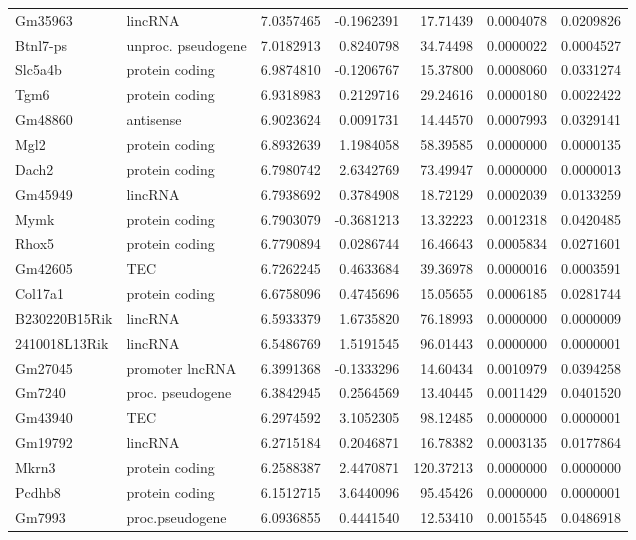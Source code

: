 \documentclass[onehalf,12pt]{beavtex}
\begin{document}
\begin{longtable}{llrrrrr}
  Gm35963 & lincRNA & 7.0357465 & -0.1962391 & 17.71439 & 0.0004078 & 0.0209826\\
  Btnl7-ps & unproc. pseudogene & 7.0182913 & 0.8240798 & 34.74498 & 0.0000022 & 0.0004527\\
  Slc5a4b & protein coding & 6.9874810 & -0.1206767 & 15.37800 & 0.0008060 & 0.0331274\\
  \addlinespace
  Tgm6 & protein coding & 6.9318983 & 0.2129716 & 29.24616 & 0.0000180 & 0.0022422\\
  Gm48860 & antisense & 6.9023624 & 0.0091731 & 14.44570 & 0.0007993 & 0.0329141\\
  Mgl2 & protein coding & 6.8932639 & 1.1984058 & 58.39585 & 0.0000000 & 0.0000135\\
  Dach2 & protein coding & 6.7980742 & 2.6342769 & 73.49947 & 0.0000000 & 0.0000013\\
  Gm45949 & lincRNA & 6.7938692 & 0.3784908 & 18.72129 & 0.0002039 & 0.0133259\\
  \addlinespace
  Mymk & protein coding & 6.7903079 & -0.3681213 & 13.32223 & 0.0012318 & 0.0420485\\
  Rhox5 & protein coding & 6.7790894 & 0.0286744 & 16.46643 & 0.0005834 & 0.0271601\\
  Gm42605 & TEC & 6.7262245 & 0.4633684 & 39.36978 & 0.0000016 & 0.0003591\\
  Col17a1 & protein coding & 6.6758096 & 0.4745696 & 15.05655 & 0.0006185 & 0.0281744\\
  B230220B15Rik & lincRNA & 6.5933379 & 1.6735820 & 76.18993 & 0.0000000 & 0.0000009\\
  \addlinespace
  2410018L13Rik & lincRNA & 6.5486769 & 1.5191545 & 96.01443 & 0.0000000 & 0.0000001\\
  Gm27045 & promoter lncRNA & 6.3991368 & -0.1333296 & 14.60434 & 0.0010979 & 0.0394258\\
  Gm7240 & proc. pseudogene & 6.3842945 & 0.2564569 & 13.40445 & 0.0011429 & 0.0401520\\
  Gm43940 & TEC & 6.2974592 & 3.1052305 & 98.12485 & 0.0000000 & 0.0000001\\
  Gm19792 & lincRNA & 6.2715184 & 0.2046871 & 16.78382 & 0.0003135 & 0.0177864\\
  \addlinespace
  Mkrn3 & protein coding & 6.2588387 & 2.4470871 & 120.37213 & 0.0000000 & 0.0000000\\
  Pcdhb8 & protein coding & 6.1512715 & 3.6440096 & 95.45426 & 0.0000000 & 0.0000001\\
  Gm7993 & proc.pseudogene & 6.0936855 & 0.4441540 & 12.53410 & 0.0015545 & 0.0486918\\

\end{longtable}
\end{document}
